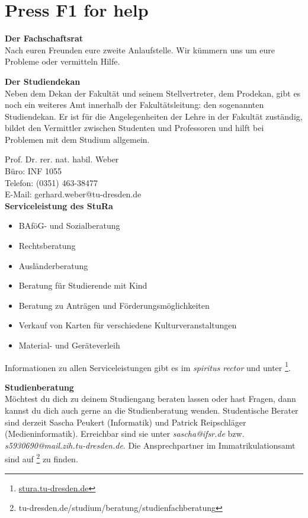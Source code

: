 \section{Press F1 for help}

\textbf{Der Fachschaftsrat} \\
Nach euren Freunden eure zweite Anlaufstelle.
Wir kümmern uns um eure Probleme oder vermitteln Hilfe.

\textbf{Der Studiendekan} \\
Neben dem Dekan der Fakultät und seinem Stellvertreter, dem Prodekan, gibt es noch ein weiteres Amt innerhalb der Fakultätsleitung:
den sogenannten Studiendekan.
Er ist für die Angelegenheiten der Lehre in der Fakultät zuständig, bildet den Vermittler zwischen Studenten und Professoren und hilft bei Problemen mit dem Studium allgemein.

Prof. Dr. rer. nat. habil. Weber \\
Büro: INF 1055 \\
Telefon: (0351) 463-38477 \\
E-Mail: gerhard.weber@tu-dresden.de \\

\textbf{Serviceleistung des StuRa} \\
\begin{itemize}
\item BAföG- und Sozialberatung
\item Rechtsberatung
\item Ausländerberatung
\item Beratung für Studierende mit Kind
\item Beratung zu Anträgen und Förderungsmöglichkeiten
\item Verkauf von Karten für verschiedene Kulturveranstaltungen
\item Material- und Geräteverleih
\end{itemize}

Informationen zu allen Serviceleistungen gibt es im \emph{spiritus rector} und unter \footnote{\url{stura.tu-dresden.de}}.

\textbf{Studienberatung} \\
Möchtest du dich zu deinem Studiengang beraten lassen oder hast Fragen, dann kannst du dich auch gerne an die Studienberatung wenden.
Studentische Berater sind derzeit Sascha Peukert (Informatik) und Patrick Reipschläger (Medieninformatik).
Erreichbar sind sie unter \emph{sascha@ifsr.de} bzw. \emph{s5930690@mail.zih.tu-dresden.de}.
Die Ansprechpartner im Immatrikulationsamt sind auf \footnote{tu-dresden.de/studium/beratung/studienfachberatung} zu finden.

